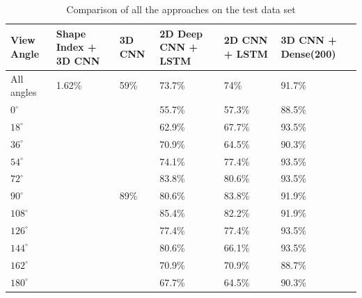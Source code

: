 \documentclass[12pt]{article}
\theoremstyle{definition}
\begin{document}
	\begin{table}[h]
		\centering
		\renewcommand{\arraystretch}{1.5}

		\caption{Comparison of all the approaches on the test data set}
		\label{table:all-results}

		\begin{tabularx}{\textwidth}{X|X|X|X|X|X}
			\textbf{View Angle} & \textbf{Shape Index + 3D CNN} & \textbf{3D CNN} & \textbf{2D Deep CNN + LSTM} & \textbf{2D CNN + LSTM} & \textbf{3D CNN + Dense(200)}\\ \hline
			All angles  & 1.62\%               & 59\%                 & 73.7\% & 74\%   & 91.7\% \\ \hline
			$0^\circ$   & \textbf{\textendash} & \textbf{\textendash} & 55.7\% & 57.3\% & 88.5\% \\ \hline
			$18^\circ$  & \textbf{\textendash} & \textbf{\textendash} & 62.9\% & 67.7\% & 93.5\% \\ \hline
			$36^\circ$  & \textbf{\textendash} & \textbf{\textendash} & 70.9\% & 64.5\% & 90.3\% \\ \hline
			$54^\circ$  & \textbf{\textendash} & \textbf{\textendash} & 74.1\% & 77.4\% & 93.5\% \\ \hline
			$72^\circ$  & \textbf{\textendash} & \textbf{\textendash} & 83.8\% & 80.6\% & 93.5\% \\ \hline
			$90^\circ$  & \textbf{\textendash} & 89\%                 & 80.6\% & 83.8\% & 91.9\% \\ \hline
			$108^\circ$ & \textbf{\textendash} & \textbf{\textendash} & 85.4\% & 82.2\% & 91.9\% \\ \hline
			$126^\circ$ & \textbf{\textendash} & \textbf{\textendash} & 77.4\% & 77.4\% & 93.5\% \\ \hline
			$144^\circ$ & \textbf{\textendash} & \textbf{\textendash} & 80.6\% & 66.1\% & 93.5\% \\ \hline
			$162^\circ$ & \textbf{\textendash} & \textbf{\textendash} & 70.9\% & 70.9\% & 88.7\% \\ \hline
			$180^\circ$ & \textbf{\textendash} & \textbf{\textendash} & 67.7\% & 64.5\% & 90.3\% \\
		\end{tabularx}
	\end{table}
\end{document}
